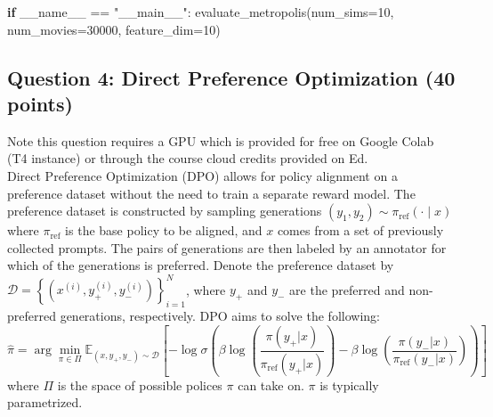 \documentclass[
  letterpaper,
  numbers=noenddot,
  DIV=11,
  oneside]{scrreprt}
\newenvironment{Shaded}{\begin{snugshade}}{\end{snugshade}}
\newcommand{\ControlFlowTok}[1]{\textcolor[rgb]{0.00,0.23,0.31}{\textbf{#1}}}
\newcommand{\DecValTok}[1]{\textcolor[rgb]{0.68,0.00,0.00}{#1}}
\newcommand{\NormalTok}[1]{\textcolor[rgb]{0.00,0.23,0.31}{#1}}
\newcommand{\OperatorTok}[1]{\textcolor[rgb]{0.37,0.37,0.37}{#1}}
\newcommand{\StringTok}[1]{\textcolor[rgb]{0.13,0.47,0.30}{#1}}
\newcommand{\VariableTok}[1]{\textcolor[rgb]{0.07,0.07,0.07}{#1}}
\theoremstyle{remark}
\begin{document}
\begin{Shaded}
\begin{Highlighting}[numbers=left,,]
\ControlFlowTok{if} \VariableTok{\_\_name\_\_} \OperatorTok{==} \StringTok{"\_\_main\_\_"}\NormalTok{:}
\NormalTok{    evaluate\_metropolis(num\_sims}\OperatorTok{=}\DecValTok{10}\NormalTok{, num\_movies}\OperatorTok{=}\DecValTok{30000}\NormalTok{, feature\_dim}\OperatorTok{=}\DecValTok{10}\NormalTok{)}
\end{Highlighting}
\end{Shaded}

\subsection*{Question 4: Direct Preference Optimization (40
points)}\label{question-4-direct-preference-optimization-40-points}

Note this question requires a GPU which is provided for free on Google
Colab (T4 instance) or through the course cloud credits provided on
Ed.\\
Direct Preference Optimization (DPO) allows for policy alignment on a
preference dataset without the need to train a separate reward model.
The preference dataset is constructed by sampling generations
\((y_1, y_2)\sim \pi_{\text{ref}}(\cdot\mid x)\) where
\(\pi_\text{ref}\) is the base policy to be aligned, and \(x\) comes
from a set of previously collected prompts. The pairs of generations are
then labeled by an annotator for which of the generations is preferred.
Denote the preference dataset by
\(\mathcal{D}=\left\{\left(x^{(i)}, y_+^{(i)}, y_-^{(i)}\right)\right\}_{i=1}^N\),
where \(y_+\) and \(y_-\) are the preferred and non-preferred
generations, respectively. DPO aims to solve the following:
\[\hat{\pi}=\arg \min_{\pi\in\Pi}\mathbb{E}_{(x, y_+, y_-)\sim\mathcal{D}}\left[-\log\sigma\left(
\beta\log\left(\frac{\pi(y_+ | x)}{\pi_{\text{ref}}(y_+ | x)}\right)-\beta\log\left(\frac{\pi(y_- | x)}{\pi_{\text{ref}}(y_- | x)}\right)\right)\right]\]
where \(\Pi\) is the space of possible polices \(\pi\) can take on.
\(\pi\) is typically parametrized.
\end{document}
